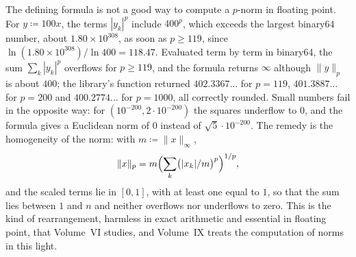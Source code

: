 \begin{table}
\end{table}

The defining formula is not a good way to compute a $p$-norm in floating point. For $y\coloneqq100x$, the terms $|y_k|^p$ include $400^p$, which exceeds the largest binary64 number, about $1.80\times10^{308}$, as soon as $p\ge119$, since $\ln(1.80\times10^{308})/\ln400=118.47$. Evaluated term by term in binary64, the sum $\sum_k|y_k|^p$ overflows for $p\ge119$, and the formula returns $\infty$ although $\|y\|_p$ is about $400$; the library's function returned $402.3367\ldots$ for $p=119$, $401.3887\ldots$ for $p=200$ and $400.2774\ldots$ for $p=1000$, all correctly rounded. Small numbers fail in the opposite way: for $(10^{-200},2\cdot10^{-200})$ the squares underflow to $0$, and the formula gives a Euclidean norm of $0$ instead of $\sqrt5\cdot10^{-200}$. The remedy is the homogeneity of the norm: with $m\coloneqq\|x\|_\infty$,
\[
\|x\|_p=m\Bigl(\sum_k\bigl(|x_k|/m\bigr)^p\Bigr)^{1/p},
\]
and the scaled terms lie in $[0,1]$, with at least one equal to $1$, so that the sum lies between $1$ and $n$ and neither overflows nor underflows to zero. This is the kind of rearrangement, harmless in exact arithmetic and essential in floating point, that Volume~VI studies, and Volume~IX treats the computation of norms in this light.

